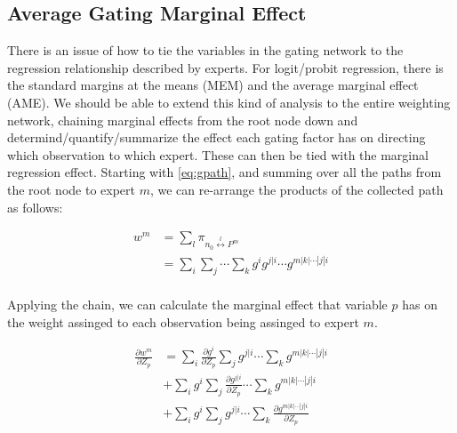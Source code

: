 \documentclass[12pt]{article}
\begin{document}
\subsection{Average Gating Marginal Effect}
There is an issue of how to tie the variables in the gating network to the regression relationship described by experts. For logit/probit regression, there is the standard margins at the means (MEM) and the average marginal effect (AME). We should be able to extend this kind of analysis to the entire weighting network, chaining marginal effects from the root node down and determind/quantify/summarize the effect each gating factor has on directing which observation to which expert. These can then be tied with the marginal regression effect. Starting with \ref{eq:gpath}, and summing over all the paths from the root node to expert $m$, we can re-arrange the products of the collected path as follows:  

\begin{equation}
  \begin{split}
  w^{m} &= \sum_{l} \pi_{n_{0} \overset{l}{\longleftrightarrow} P^{m}} \\
        &= \sum_{i} \sum_{j} \cdots \sum_{k} g^{i} g^{j|i} \cdots g^{m|k|\cdots|j|i} \\
  \end{split}
\end{equation}

Applying the chain, we can calculate the marginal effect that variable $p$ has on the weight assinged to each observation being assinged to expert $m$.

\begin{equation}
  \begin{split}
    \frac{\partial w^{m}}{\partial Z_{p}} &= \sum_{i} \frac{\partial g^{i}}{\partial Z_{p}} \sum_{j} g^{j|i} \cdots \sum_{k} g^{m|k|\cdots|j|i} \\
    &+ \sum_{i} g^{i} \sum_{j} \frac{\partial g^{j|i}}{\partial Z_{p}} \cdots \sum_{k} g^{m|k|\cdots|j|i} \\
    &+ \sum_{i} g^{i} \sum_{j} g^{j|i} \cdots \sum_{k} \frac{\partial g^{m|k|\cdots|j|i}}{\partial Z_{p}} \\
  \end{split}
\end{equation}
\end{document}
